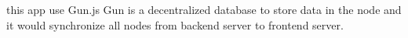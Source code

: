 this app use Gun.js Gun is a decentralized database to store data in the node and it would synchronize all nodes from backend server to frontend server.